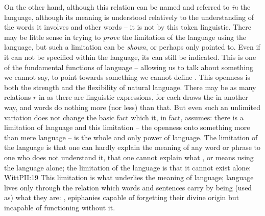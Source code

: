 On the other hand, although this relation can be named and
referred to {\em in} the language, although its meaning is understood relatively
to the understanding of the words it involves and other words -- it is not by
this token linguistic.  There may be little sense in trying to {\em prove} the
limitation of the language using the language, but such a limitation can be {\em
  shown}, or perhaps only pointed to. Even if it can not be 
specified within the language, its  can still be 
indicated. This is one of the fundamental functions of language -- allowing us
to talk about something we cannot say, to point towards something we
cannot define . This openness is both the strength and the flexibility
of natural language.  There may be as many relations $r$ in  as
there are linguistic expressions, for each draws the  in
another way, and words do nothing more (nor less) than that. But even such an
unlimited variation does not change the basic fact which it, in fact, assumes:
there is a limitation of language and this limitation -- the openness onto
something more than mere language -- is the whole and only power of
language. The limitation of the
language is that one can hardly explain the meaning of any 
word or phrase to one who does not understand it, that one cannot explain what
,  or  means using the language alone; the
limitation of the language is that it cannot exist alone: \citet{to imagine a
  language means to imagine a form of life.}{WittPI}{I:19} This limitation is
what underlies the meaning of language; language lives only through the relation
which words and sentences carry by being (used as) what they are:
, epiphanies capable of forgetting their
divine origin but incapable of functioning without it.




